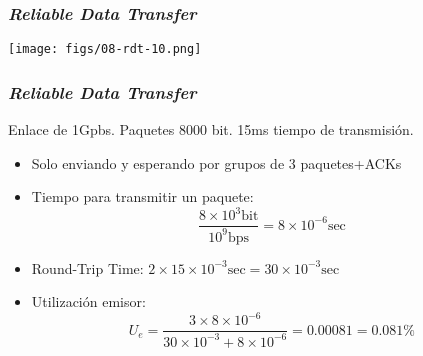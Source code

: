 \documentclass[letter]{beamer}
\begin{document}
\begin{frame}
  \frametitle{{\em Reliable Data Transfer}}

  \begin{center}
    \texttt{[image: figs/08-rdt-10.png]}
  \end{center}

\end{frame}
\begin{frame}
  \frametitle{{\em Reliable Data Transfer}}

  Enlace de 1Gpbs. Paquetes 8000 bit. 15ms tiempo de transmisión.
  \begin{itemize}
    \item Solo enviando y esperando por grupos de 3 paquetes+ACKs
    \item Tiempo para transmitir un paquete:
      \[ \frac{8\times 10^3 \text{bit}}{10^9 \text{bps}} = 8 \times 10^{-6} \text{sec} \]
    \item Round-Trip Time: $2 \times 15 \times 10^{-3} \text{sec} = 30 \times 10^{-3} \text{sec}$
    \item Utilización emisor:
      \[ U_e = \frac{3\times 8 \times 10^{-6}}{30\times 10^{-3} + 8\times 10^{-6}} = 0.00081 = 0.081 \% \]
  \end{itemize}

\end{frame}
  
\end{document}
